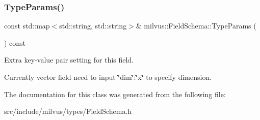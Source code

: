 \subsubsection{\texorpdfstring{Type\+Params()}{TypeParams()}}
{\footnotesize\ttfamily const std\+::map$<$std\+::string, std\+::string$>$\& milvus\+::\+Field\+Schema\+::\+Type\+Params (\begin{DoxyParamCaption}{ }\end{DoxyParamCaption}) const\hspace{0.3cm}{\ttfamily [inline]}}



Extra key-\/value pair setting for this field. 

Currently vector field need to input \char`\"{}dim\char`\"{}\+:\char`\"{}x\char`\"{} to specify dimension. 

The documentation for this class was generated from the following file\+:\begin{DoxyCompactItemize}
\item 
src/include/milvus/types/Field\+Schema.\+h\end{DoxyCompactItemize}

